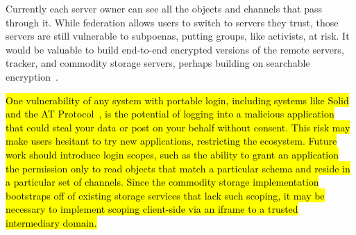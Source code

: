 Currently each server owner can see all the objects and channels
that pass through it. While federation allows users to switch
to servers they trust, those servers are still vulnerable to
subpoenas, putting groups, like activists, at risk.
It would be valuable to build end-to-end encrypted versions of the remote servers,
tracker, and commodity storage servers, perhaps building on
searchable encryption~\cite{searchableencryption}.

\hl{%
One vulnerability of any system with portable login,
including systems like Solid and the AT Protocol~{\cite{bluesky}},
is the potential of logging into
a malicious application that could steal your data or
post on your behalf without consent.
This risk may make users hesitant to try new applications,
restricting the ecosystem.
Future work should introduce login scopes, such as
the ability to grant an application the permission only to read objects
that match a particular schema and reside in a particular set of channels.
Since the commodity storage implementation bootstraps off of
existing storage services that lack such scoping,
it may be necessary to implement scoping client-side
via an iframe to a trusted intermediary domain.
}%
